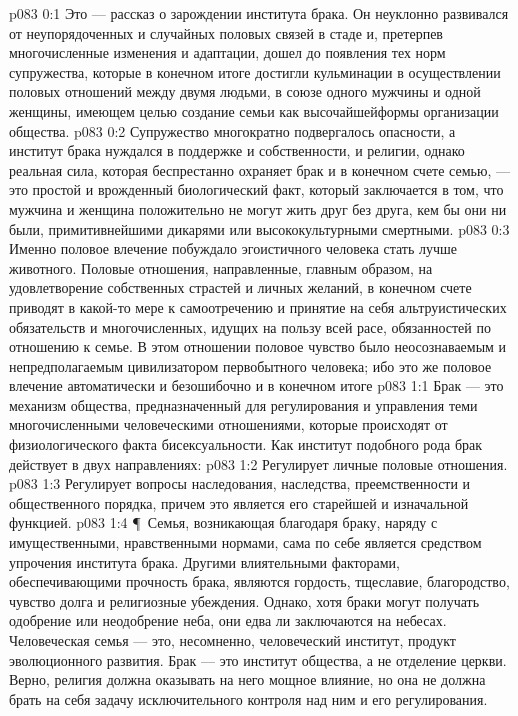 \vs p083 0:1 Это --- рассказ о зарождении института брака. Он неуклонно развивался от неупорядоченных и случайных половых связей в стаде и, претерпев многочисленные изменения и адаптации, дошел до появления тех норм супружества, которые в конечном итоге достигли кульминации в осуществлении половых отношений между двумя людьми, в союзе одного мужчины и одной женщины, имеющем целью создание семьи как высочайшейформы организации общества.
\vs p083 0:2 Супружество многократно подвергалось опасности, а институт брака нуждался в поддержке и собственности, и религии, однако реальная сила, которая беспрестанно охраняет брак и в конечном счете семью, --- это простой и врожденный биологический факт, который заключается в том, что мужчина и женщина положительно не могут жить друг без друга, кем бы они ни были, примитивнейшими дикарями или высококультурными смертными.
\vs p083 0:3 Именно половое влечение побуждало эгоистичного человека стать лучше животного. Половые отношения, направленные, главным образом, на удовлетворение собственных страстей и личных желаний, в конечном счете приводят в какой\hyp{}то мере к самоотречению и принятие на себя альтруистических обязательств и многочисленных, идущих на пользу всей расе, обязанностей по отношению к семье. В этом отношении половое чувство было неосознаваемым и непредполагаемым цивилизатором первобытного человека; ибо это же половое влечение автоматически и безошибочно  и в конечном итоге 
\vs p083 1:1 Брак --- это механизм общества, предназначенный для регулирования и управления теми многочисленными человеческими отношениями, которые происходят от физиологического факта бисексуальности. Как институт подобного рода брак действует в двух направлениях:
\vs p083 1:2 \bibnobreakspace Регулирует личные половые отношения.
\vs p083 1:3 \bibnobreakspace Регулирует вопросы наследования, наследства, преемственности и общественного порядка, причем это является его старейшей и изначальной функцией.
\vs p083 1:4 \P\ Семья, возникающая благодаря браку, наряду с имущественными, нравственными нормами, сама по себе является средством упрочения института брака. Другими влиятельными факторами, обеспечивающими прочность брака, являются гордость, тщеславие, благородство, чувство долга и религиозные убеждения. Однако, хотя браки могут получать одобрение или неодобрение неба, они едва ли заключаются на небесах. Человеческая семья --- это, несомненно, человеческий институт, продукт эволюционного развития. Брак --- это институт общества, а не отделение церкви. Верно, религия должна оказывать на него мощное влияние, но она не должна брать на себя задачу исключительного контроля над ним и его регулирования.
